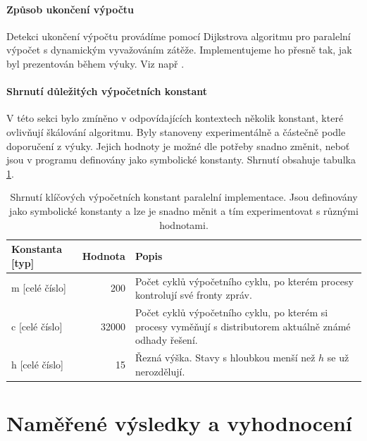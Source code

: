 \documentclass[12pt]{article}
\theoremstyle{definition}
\begin{document}
\paragraph{Způsob ukončení výpočtu}
Detekci ukončení výpočtu provádíme pomocí Dijkstrova algoritmu
pro paralelní výpočet s dynamickým vyvažováním zátěže. Implementujeme ho
přesně tak, jak byl prezentován během výuky. Viz např \cite[str. 490-491]{pars}.
\paragraph{Shrnutí důležitých výpočetních konstant}\mbox{}\newline
V této sekci bylo zmíněno v odpovídajících kontextech několik konstant,
které ovlivňují škálování algoritmu. Byly stanoveny experimentálně a částečně
podle doporučení z výuky. Jejich hodnoty je možné dle potřeby snadno změnit, neboť
jsou v programu definovány jako symbolické konstanty. Shrnutí obsahuje tabulka \ref{tabKonst}.
\begin{table}[ht]
\centering
\begin{tabular}{p{2.9cm}|r|p{7.6cm}}
	Konstanta [typ] & Hodnota & Popis\\
	\hline\hline
	m [celé číslo] & 200 & Počet cyklů výpočetního cyklu, po kterém procesy kontrolují své fronty zpráv.\\
	\hline
	c [celé číslo] & 32000 & Počet cyklů výpočetního cyklu, po kterém si procesy vyměňují s distributorem
	aktuálně známé odhady řešení.\\
	\hline
	h [celé číslo] & 15 & Řezná výška. Stavy s hloubkou menší než $h$ se už nerozdělují.\\
\end{tabular}
\caption{Shrnutí klíčových výpočetních konstant paralelní implementace. Jsou definovány jako
	symbolické konstanty a lze je snadno měnit a tím experimentovat s různými hodnotami.}\label{tabKonst}
\end{table}	

\section{Naměřené výsledky a vyhodnocení}
\end{document}
